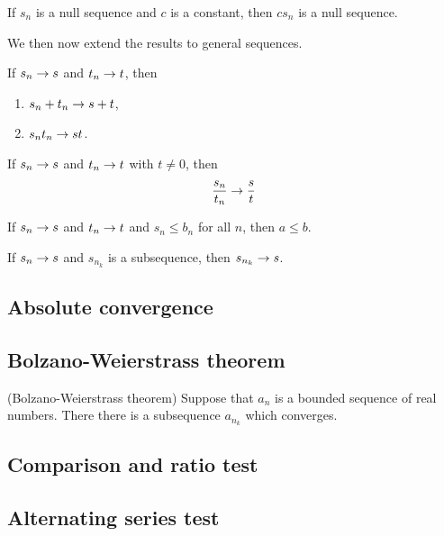 \documentclass[main.tex]{subfiles}
\begin{document}
	\begin{corollary}
		If $s_n$ is a null sequence and $c$ is a constant, then $cs_n$ is a null sequence.
	\end{corollary}
	We then now extend the results to general sequences.
	\begin{theorem}
		If $s_n \rightarrow s$ and $t_n \rightarrow t$, then
		\begin{enumerate}
			\item $s_n + t_n \rightarrow s + t$,
			\item $s_n t_n \rightarrow st$.
		\end{enumerate}
	\end{theorem}
	
	\begin{theorem}
		If $s_n \rightarrow s$ and $t_n \rightarrow t$ with $t \neq 0$, then
		\begin{equation*}
		\frac{s_n}{t_n} \rightarrow \frac{s}{t}
		\end{equation*}
	\end{theorem}
	
	\begin{theorem}
		If $s_n \rightarrow s$ and $t_n \rightarrow t$ and $s_n \leq b_n$ for all $n$, then $a \leq b$.
	\end{theorem}
	
	\begin{theorem}
		If $s_n \rightarrow s$ and $s_{n_k}$ is a subsequence, then $s_{n_k} \rightarrow s$.
	\end{theorem}
	
	\subsection{Absolute convergence}
	
	\subsection{Bolzano-Weierstrass theorem}
	\begin{theorem}(Bolzano-Weierstrass theorem)
		Suppose that $a_n$ is a bounded sequence of real numbers. There there is a subsequence $a_{n_k}$ which converges.
	\end{theorem}
	\subsection{Comparison and ratio test}
	
	\subsection{Alternating series test}
	
\end{document}
